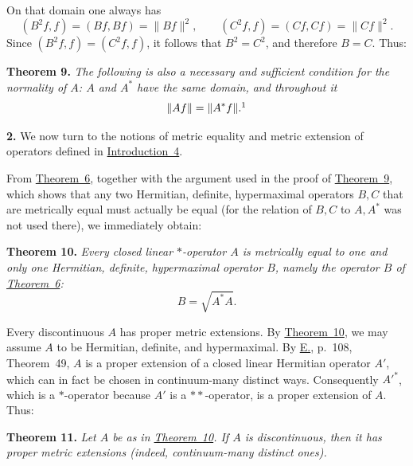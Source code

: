 \documentclass[fontsize=13pt,paper=b5,leqno,bookmarkpackage=false]{scrartcl}
\begin{document}
On that domain one always has
\[
  (B^2f,f)=(Bf,Bf)=\lVert Bf\rVert^2,
  \qquad
  (C^2f,f)=(Cf,Cf)=\lVert Cf\rVert^2.
\]
Since \((B^2f,f)=(C^2f,f)\), it follows that \(B^2=C^2\), and therefore
\(B=C\).  Thus:

\par\smallskip
{}
\label{thm:9}
\noindent\textbf{Theorem 9.}
\textit{The following is also a necessary and sufficient condition for
the normality of \(A\): \(A\) and \(A^*\) have the same domain, and
throughout it}
\[
  \lVert Af\rVert=\lVert A^*f\rVert.\footnotemark
\]

\label{subsec:II.2}
\noindent\textbf{2.}
We now turn to the notions of metric equality and metric extension of
operators defined in \hyperref[intro:4]{Introduction~4}.

From \hyperref[thm:6]{Theorem~6}, together with the argument used in the
proof of \hyperref[thm:9]{Theorem~9}, which shows that any two Hermitian,
definite, hypermaximal operators \(B,C\) that are metrically equal must
actually be equal (for the relation of \(B,C\) to \(A,A^*\) was not used
there), we immediately obtain:

\par\smallskip
{}
\label{thm:10}
\noindent\textbf{Theorem 10.}
\textit{Every closed linear \(*\)-operator \(A\) is metrically equal to
one and only one Hermitian, definite, hypermaximal operator \(B\), namely
the operator \(B\) of \hyperref[thm:6]{Theorem~6}:}
\[
  B=\sqrt{A^*A}.
\]

Every discontinuous \(A\) has proper metric extensions.  By
\hyperref[thm:10]{Theorem~10}, we may assume \(A\) to be Hermitian,
definite, and hypermaximal.  By \hyperlink{bib:E}{E.}, p.~108,
Theorem~49, \(A\) is a proper extension of a closed linear Hermitian
operator \(A'\), which can in fact be chosen in continuum-many distinct
ways.  Consequently \(A'^{*}\), which is a \(*\)-operator because \(A'\)
is a \(**\)-operator, is a proper extension of \(A\).  Thus:


\par\smallskip
{}
\label{thm:11}
\noindent\textbf{Theorem 11.}
\textit{Let \(A\) be as in \hyperref[thm:10]{Theorem~10}.  If \(A\) is
discontinuous, then it has proper metric extensions (indeed,
continuum-many distinct ones).}
\end{document}
